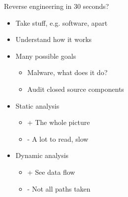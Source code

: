 \documentclass[10pt, compress]{beamer}
\begin{document}
\begin{frame}{Reverse engineering in 30 seconds?}

 \begin{itemize}
  \item Take stuff, e.g. software, apart
  \item Understand how it works
  \item Many possible goals
    \begin{itemize}
  	\item Malware, what does it do?
  	\item Audit closed source components
    \end{itemize}  
  \item Static analysis
  \begin{itemize}
    \item + The whole picture
    \item - A lot to read, slow
  \end{itemize}  
  \item Dynamic analysis
  \begin{itemize}
    \item + See data flow
    \item - Not all paths taken
  \end{itemize}  
  \end{itemize}    

\end{frame}
\end{document}

